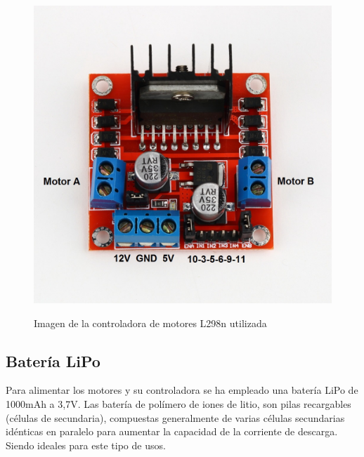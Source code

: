 \begin{figure}[H]
  \begin{center}
    \includegraphics[scale=0.8]{imagenes/l298n.jpg}\\
    \caption{Imagen de la controladora de motores L298n utilizada}
  \end{center}
\end{figure}



\subsection{ Batería LiPo }

Para alimentar los motores y su controladora se ha empleado una batería LiPo de 1000mAh a 3,7V. Las batería de polímero de iones de litio, son pilas recargables (células de secundaria), compuestas generalmente de varias células secundarias idénticas en paralelo para aumentar la capacidad 
de la corriente de descarga. Siendo ideales para este tipo de usos.

